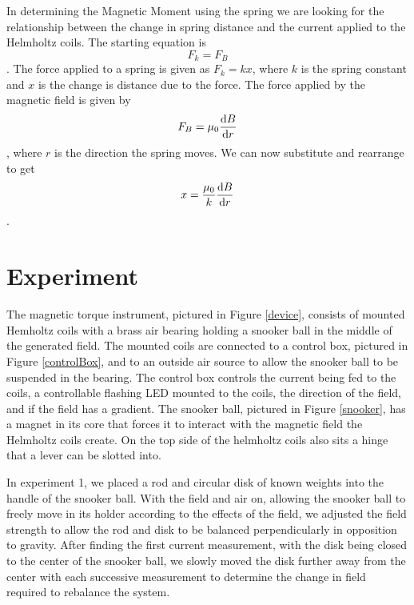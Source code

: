 \documentclass[aps,prl,10pt,twocolumn,floatfix]{revtex4-2}
\begin{document}
In determining the Magnetic Moment using the spring we are looking for the relationship between the change in spring distance and the current applied to the Helmholtz coils.
The starting equation is
\begin{equation*}
    F_k=F_B
\end{equation*}.
The force applied to a spring is given as $F_k=kx$, where $k$ is the spring constant and $x$ is the change is distance due to the force. 
The force applied by the magnetic field is given by
\begin{equation*}
    F_B=\mu_0\dv{B}{r}
\end{equation*},
where $r$ is the direction the spring moves.
We can now substitute and rearrange to get
\begin{equation}
    x=\frac{\mu_0}{k}\dv{B}{r}
\end{equation}.


\section{Experiment}
The magnetic torque instrument, pictured in Figure \ref{device}, consists of mounted Hemholtz coils with a brass air bearing holding a snooker ball in the middle of the generated field. 
The mounted coils are connected to a control box, pictured in Figure \ref{controlBox}, and to an outside air source to allow the snooker ball to be suspended in the bearing. 
The control box controls the current being fed to the coils, a controllable flashing LED mounted to the coils, the direction of the field, and if the field has a gradient. 
The snooker ball, pictured in Figure \ref{snooker}, has a magnet in its core that forces it to interact with the magnetic field the Helmholtz coils create.
On the top side of the helmholtz coils also sits a hinge that a lever can be slotted into. 

In experiment 1, we placed a rod and circular disk of known weights into the handle of the snooker ball. 
With the field and air on, allowing the snooker ball to freely move in its holder according to the effects of the field, we adjusted the field strength to allow the rod and disk to be balanced perpendicularly in opposition to gravity. 
After finding the first current measurement, with the disk being closed to the center of the snooker ball, we slowly moved the disk further away from the center with each successive measurement to determine the change in field required to rebalance the system.
\end{document}
